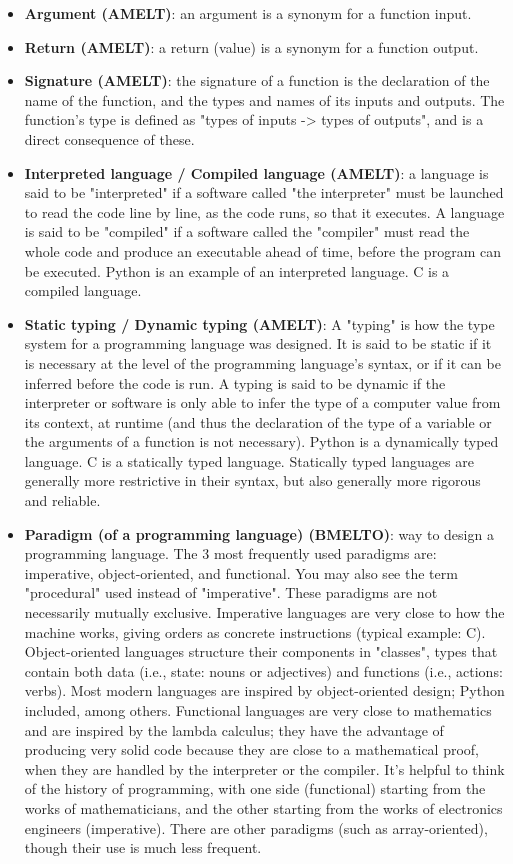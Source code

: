 \documentclass{article}
\begin{document}
\begin{itemize}
	\item \textbf{Argument (AMELT)}: an argument is a synonym for a function input.

	\item \textbf{Return (AMELT)}: a return (value) is a synonym for a function output.

	\item \textbf{Signature (AMELT)}: the signature of a function is the declaration of the name of the function, and the types and names of its inputs and outputs. The function's type is defined as "types of inputs -> types of outputs", and is a direct consequence of these.

	\item \textbf{Interpreted language / Compiled language (AMELT)}: a language is said to be "interpreted" if a software called "the interpreter" must be launched to read the code line by line, as the code runs, so that it executes. A language is said to be "compiled" if a software called the "compiler" must read the whole code and produce an executable ahead of time, before the program can be executed. Python is an example of an interpreted language. C is a compiled language.

	\item \textbf{Static typing / Dynamic typing (AMELT)}: A "typing" is how the type system for a programming language was designed. It is said to be static if it is necessary at the level of the programming language's syntax, or if it can be inferred before the code is run. A typing is said to be dynamic if the interpreter or software is only able to infer the type of a computer value from its context, at runtime (and thus the declaration of the type of a variable or the arguments of a function is not necessary). Python is a dynamically typed language. C is a statically typed language. Statically typed languages are generally more restrictive in their syntax, but also generally more rigorous and reliable.

	\item \textbf{Paradigm (of a programming language) (BMELTO)}: way to design a programming language. The 3 most frequently used paradigms are: imperative, object-oriented, and functional. You may also see the term "procedural" used instead of "imperative". These paradigms are not necessarily mutually exclusive. Imperative languages are very close to how the machine works, giving orders as concrete instructions (typical example: C). Object-oriented languages structure their components in "classes", types that contain both data (i.e., state: nouns or adjectives) and functions (i.e., actions: verbs). Most modern languages are inspired by object-oriented design; Python included, among others. Functional languages are very close to mathematics and are inspired by the lambda calculus; they have the advantage of producing very solid code because they are close to a mathematical proof, when they are handled by the interpreter or the compiler. It's helpful to think of the history of programming, with one side (functional) starting from the works of mathematicians, and the other starting from the works of electronics engineers (imperative). There are other paradigms (such as array-oriented), though their use is much less frequent.


\end{itemize}
\end{document}
